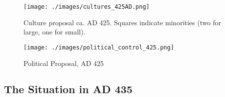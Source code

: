 \documentclass{article}
\begin{document}
	\newpage
	
	\begin{figure}[h!]
		\centering
		\texttt{[image: ./images/cultures\_425AD.png]}
		\caption{Culture proposal ca. AD 425. Squares indicate minorities (two for large, one for small).}
	\end{figure}
	
	\begin{figure}[h!]
		\centering
		\texttt{[image: ./images/political\_control\_425.png]}
		\caption{Political Proposal, AD 425}
	\end{figure}
	
	\newpage
	
	\subsection{The Situation in AD 435}
	\label{sec:timeline:subsec:435}
	
\end{document}

